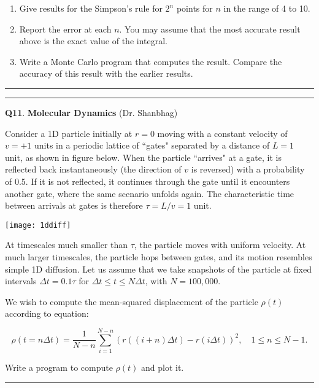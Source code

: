 \documentclass[11pt,letterpaper]{article}
\newcommand{\highlight}[1]{\textcolor{BrickRed}{#1}}
\begin{document}
\begin{enumerate}
\item Give results for the Simpson's rule for $2^n$ points for $n$ in the range of 4 to 10.
\item Report the error at each $n$. You may assume that the most accurate result above is the exact value of the integral.
\item Write a Monte Carlo program that computes the result. Compare the accuracy of this result with the earlier results.  
\end{enumerate}

\bigskip
\hrule \medskip

\pagebreak

\pagebreak
\hrule 
\medskip
\textbf{Q11}. \highlight{\textbf{Molecular Dynamics}} (Dr. Shanbhag)

\bigskip

Consider a 1D particle initially at $r = 0$ moving with a constant velocity of $v=+1$ units in a periodic lattice of ``gates" separated by a distance of $L = 1$ unit, as shown in figure below. When the particle ``arrives" at a gate, it is reflected back instantaneously (the direction of $v$ is reversed) with a probability of 0.5. If it is not reflected, it continues through the gate until it encounters another gate, where the same scenario unfolds again. The characteristic time between arrivals at gates is therefore $\tau = L/v = 1$ unit.

\begin{center}
\texttt{[image: 1ddiff]}
\end{center}

At timescales much smaller than $\tau$, the particle moves with uniform velocity. At much larger timescales, the particle hops between gates, and its motion resembles simple 1D diffusion. Let us assume that we take snapshots of the particle at fixed intervals $\Delta t = 0.1 \tau$ for $\Delta t \leq t \leq N \Delta t$, with $N = 100,000$.

\medskip

We wish to compute the mean-squared displacement of the particle $\rho(t)$ according to equation:

$$\rho(t = n \Delta t) = \frac{1}{N-n} \sum_{i=1}^{N-n} \left( r((i+n) \Delta t) - r(i \Delta t) \right)^2,\quad 1 \leq n \leq N-1.$$

Write a program to compute $\rho(t)$ and plot it.

\bigskip
\hrule \medskip

\pagebreak
\end{document}
